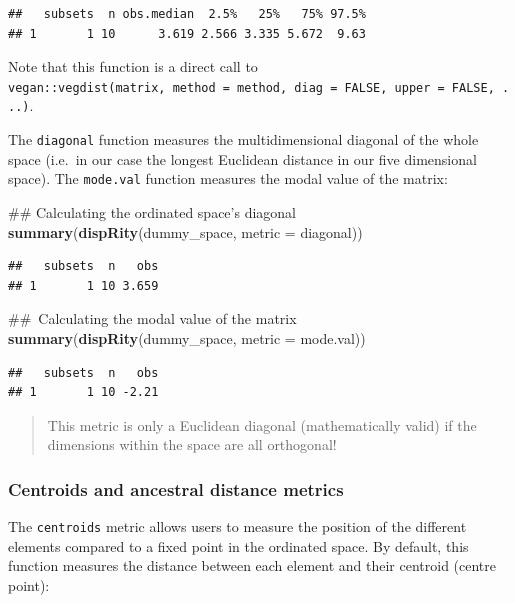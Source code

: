 \documentclass[]{book}
\newenvironment{Shaded}{\begin{snugshade}}{\end{snugshade}}
\newcommand{\KeywordTok}[1]{\textcolor[rgb]{0.13,0.29,0.53}{\textbf{#1}}}
\newcommand{\DataTypeTok}[1]{\textcolor[rgb]{0.13,0.29,0.53}{#1}}
\newcommand{\NormalTok}[1]{#1}
\theoremstyle{definition}
\theoremstyle{definition}
\theoremstyle{definition}
\theoremstyle{remark}
\begin{document}
\begin{verbatim}
##   subsets  n obs.median  2.5%   25%   75% 97.5%
## 1       1 10      3.619 2.566 3.335 5.672  9.63
\end{verbatim}

Note that this function is a direct call to
\texttt{vegan::vegdist(matrix,\ method\ =\ method,\ diag\ =\ FALSE,\ upper\ =\ FALSE,\ ...)}.

The \texttt{diagonal} function measures the multidimensional diagonal of
the whole space (i.e.~in our case the longest Euclidean distance in our
five dimensional space). The \texttt{mode.val} function measures the
modal value of the matrix:

\begin{Shaded}
\begin{Highlighting}[]
\NormalTok{## Calculating the ordinated space's diagonal}
\KeywordTok{summary}\NormalTok{(}\KeywordTok{dispRity}\NormalTok{(dummy_space, }\DataTypeTok{metric =}\NormalTok{ diagonal))}
\end{Highlighting}
\end{Shaded}

\begin{verbatim}
##   subsets  n   obs
## 1       1 10 3.659
\end{verbatim}

\begin{Shaded}
\begin{Highlighting}[]
\NormalTok{## Calculating the modal value of the matrix}
\KeywordTok{summary}\NormalTok{(}\KeywordTok{dispRity}\NormalTok{(dummy_space, }\DataTypeTok{metric =}\NormalTok{ mode.val))}
\end{Highlighting}
\end{Shaded}

\begin{verbatim}
##   subsets  n   obs
## 1       1 10 -2.21
\end{verbatim}

\begin{quote}
This metric is only a Euclidean diagonal (mathematically valid) if the
dimensions within the space are all orthogonal!
\end{quote}

\subsubsection{Centroids and ancestral distance
metrics}\label{centroids-and-ancestral-distance-metrics}

The \texttt{centroids} metric allows users to measure the position of
the different elements compared to a fixed point in the ordinated space.
By default, this function measures the distance between each element and
their centroid (centre point):
\end{document}
